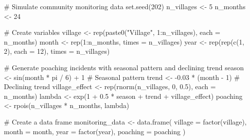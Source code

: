 \documentclass[
  letterpaper,
]{book}
\newenvironment{Shaded}{\begin{snugshade}}{\end{snugshade}}
\newcommand{\AttributeTok}[1]{\textcolor[rgb]{0.40,0.45,0.13}{#1}}
\newcommand{\CommentTok}[1]{\textcolor[rgb]{0.37,0.37,0.37}{#1}}
\newcommand{\DecValTok}[1]{\textcolor[rgb]{0.68,0.00,0.00}{#1}}
\newcommand{\FloatTok}[1]{\textcolor[rgb]{0.68,0.00,0.00}{#1}}
\newcommand{\FunctionTok}[1]{\textcolor[rgb]{0.28,0.35,0.67}{#1}}
\newcommand{\NormalTok}[1]{\textcolor[rgb]{0.00,0.23,0.31}{#1}}
\newcommand{\OtherTok}[1]{\textcolor[rgb]{0.00,0.23,0.31}{#1}}
\newcommand{\SpecialCharTok}[1]{\textcolor[rgb]{0.37,0.37,0.37}{#1}}
\newcommand{\StringTok}[1]{\textcolor[rgb]{0.13,0.47,0.30}{#1}}
\begin{document}
\begin{Shaded}
\begin{Highlighting}[]
\CommentTok{\# Simulate community monitoring data}
\FunctionTok{set.seed}\NormalTok{(}\DecValTok{202}\NormalTok{)}
\NormalTok{n\_villages }\OtherTok{\textless{}{-}} \DecValTok{5}
\NormalTok{n\_months }\OtherTok{\textless{}{-}} \DecValTok{24}

\CommentTok{\# Create variables}
\NormalTok{village }\OtherTok{\textless{}{-}} \FunctionTok{rep}\NormalTok{(}\FunctionTok{paste0}\NormalTok{(}\StringTok{"Village"}\NormalTok{, }\DecValTok{1}\SpecialCharTok{:}\NormalTok{n\_villages), }\AttributeTok{each =}\NormalTok{ n\_months)}
\NormalTok{month }\OtherTok{\textless{}{-}} \FunctionTok{rep}\NormalTok{(}\DecValTok{1}\SpecialCharTok{:}\NormalTok{n\_months, }\AttributeTok{times =}\NormalTok{ n\_villages)}
\NormalTok{year }\OtherTok{\textless{}{-}} \FunctionTok{rep}\NormalTok{(}\FunctionTok{rep}\NormalTok{(}\FunctionTok{c}\NormalTok{(}\DecValTok{1}\NormalTok{, }\DecValTok{2}\NormalTok{), }\AttributeTok{each =} \DecValTok{12}\NormalTok{), }\AttributeTok{times =}\NormalTok{ n\_villages)}

\CommentTok{\# Generate poaching incidents with seasonal pattern and declining trend}
\NormalTok{season }\OtherTok{\textless{}{-}} \FunctionTok{sin}\NormalTok{(month }\SpecialCharTok{*}\NormalTok{ pi }\SpecialCharTok{/} \DecValTok{6}\NormalTok{) }\SpecialCharTok{+} \DecValTok{1}  \CommentTok{\# Seasonal pattern}
\NormalTok{trend }\OtherTok{\textless{}{-}} \SpecialCharTok{{-}}\FloatTok{0.03} \SpecialCharTok{*}\NormalTok{ (month }\SpecialCharTok{{-}} \DecValTok{1}\NormalTok{)  }\CommentTok{\# Declining trend}
\NormalTok{village\_effect }\OtherTok{\textless{}{-}} \FunctionTok{rep}\NormalTok{(}\FunctionTok{rnorm}\NormalTok{(n\_villages, }\DecValTok{0}\NormalTok{, }\FloatTok{0.5}\NormalTok{), }\AttributeTok{each =}\NormalTok{ n\_months)}
\NormalTok{lambda }\OtherTok{\textless{}{-}} \FunctionTok{exp}\NormalTok{(}\DecValTok{1} \SpecialCharTok{+} \FloatTok{0.5} \SpecialCharTok{*}\NormalTok{ season }\SpecialCharTok{+}\NormalTok{ trend }\SpecialCharTok{+}\NormalTok{ village\_effect)}
\NormalTok{poaching }\OtherTok{\textless{}{-}} \FunctionTok{rpois}\NormalTok{(n\_villages }\SpecialCharTok{*}\NormalTok{ n\_months, lambda)}

\CommentTok{\# Create a data frame}
\NormalTok{monitoring\_data }\OtherTok{\textless{}{-}} \FunctionTok{data.frame}\NormalTok{(}
  \AttributeTok{village =} \FunctionTok{factor}\NormalTok{(village),}
  \AttributeTok{month =}\NormalTok{ month,}
  \AttributeTok{year =} \FunctionTok{factor}\NormalTok{(year),}
  \AttributeTok{poaching =}\NormalTok{ poaching}
\NormalTok{)}


\end{Highlighting}
\end{Shaded}
\end{document}
